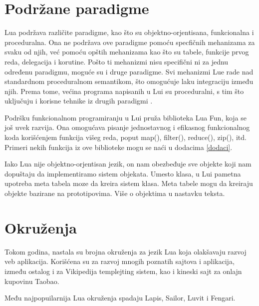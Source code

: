\documentclass[a4paper]{article}
\begin{document}
\section{Podržane paradigme}
\label{sec:paradigme}


Lua podržava različite paradigme, kao što su objektno-orjentisana, funkcionalna i proceduralna. Ona ne podržava ove paradigme pomoću specfičnih mehanizama za svaku od njih, već pomoću opštih mehanizama kao što su tabele, funkcije prvog reda, delegacija i korutine. Pošto ti mehanizmi nisu specifični ni za jednu određenu paradigmu, moguće su i druge paradigme. Svi mehanizmi Lue rade nad standardnom proceduralnom semantikom, što omogućuje laku integraciju između njih. Prema tome, većina programa napisanih u Lui su proceduralni, s tim što uključuju i korisne tehnike iz drugih paradigmi \cite{multiParadigms} .

Podršku funkcionalnom programiranju u Lui pruža biblioteka Lua Fun, koja se još uvek razvija. Ona omogućava pisanje jednostavnog i efikasnog funkcionalnog koda korišćenjem funkcija višeg reda, poput map(), filter(), reduce(), zip(), itd. Primeri nekih funkcija iz ove biblioteke mogu se naći u dodacima \ref{dodaci}.



Iako Lua nije objektno-orjentisan jezik, on nam obezbeđuje sve objekte koji nam dopuštaju da implementiramo sistem objekata. Umesto klasa, u Lui pametna upotreba meta tabela moze da kreira sistem klasa. Meta tabele mogu da kreiraju objekte bazirane na prototipovima. Više o objektima u nastavku teksta.


\section{Okruženja}
\label{sec:okruzenja}


Tokom godina, nastala su brojna okruženja za jezik Lua koja olakšavaju razvoj veb aplikacija. Korišćena su za razvoj mnogih poznatih sajtova i aplikacija, između ostalog i za Vikipedija templejting sistem, kao i kineski sajt za onlajn kupovinu Taobao.

Među najpopuilarnija Lua okruženja spadaju Lapis, Sailor, Luvit i Fengari.
\end{document}
